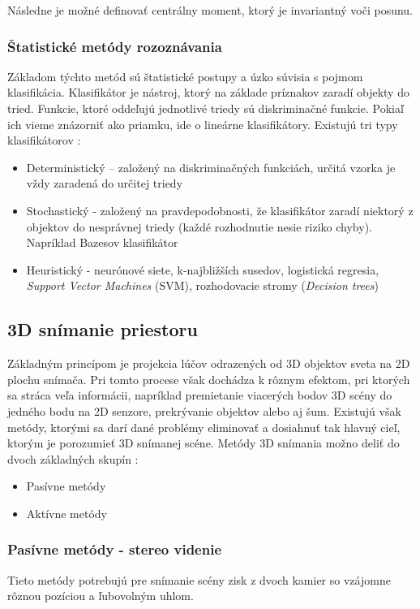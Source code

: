 Následne je možné definovať centrálny moment, ktorý je invariantný voči posunu. 


\subsubsection{Štatistické metódy rozoznávania}
Základom týchto metód sú štatistické postupy a úzko súvisia s pojmom klasifikácia. Klasifikátor je nástroj, ktorý na základe príznakov zaradí objekty do tried. Funkcie, ktoré oddeľujú jednotlivé triedy sú diskriminačné funkcie. Pokiaľ ich vieme znázorniť ako priamku, ide o lineárne klasifikátory. Existujú tri typy klasifikátorov \cite{pocitacove_videnie_v_praxi}:

\begin{itemize}
    \item Deterministický  – založený na diskriminačných funkciách, určitá vzorka je vždy zaradená do určitej triedy 
    \item Stochastický -  založený na pravdepodobnosti, že klasifikátor zaradí niektorý z objektov do nesprávnej triedy (každé rozhodnutie nesie riziko chyby). Napríklad Bazesov klasifikátor
    \item Heuristický - neurónové siete, k-najbližších susedov, logistická regresia, \textit{Support Vector Machines} (SVM), rozhodovacie stromy (\textit{Decision trees}) 
\end{itemize}

\subsection{3D snímanie priestoru}
Základným princípom je projekcia lúčov odrazených od 3D objektov sveta na 2D plochu snímača. Pri tomto procese však dochádza k rôznym efektom, pri ktorých sa stráca veľa informácii, napríklad premietanie viacerých bodov 3D scény do jedného bodu na 2D senzore, prekrývanie objektov alebo aj šum. Existujú však metódy, ktorými sa darí dané problémy eliminovať a dosiahnuť tak  hlavný cieľ, ktorým je porozumieť 3D snímanej scéne. Metódy 3D snímania možno deliť do dvoch základných skupín \cite{Analysis_and_Machine_Vision}:

\begin{itemize}
    \item Pasívne metódy
    \item Aktívne metódy 
\end{itemize}

\subsubsection{Pasívne metódy - stereo videnie}
Tieto metódy potrebujú pre snímanie scény zisk z dvoch kamier so vzájomne rôznou pozíciou a ľubovolným uhlom. 

